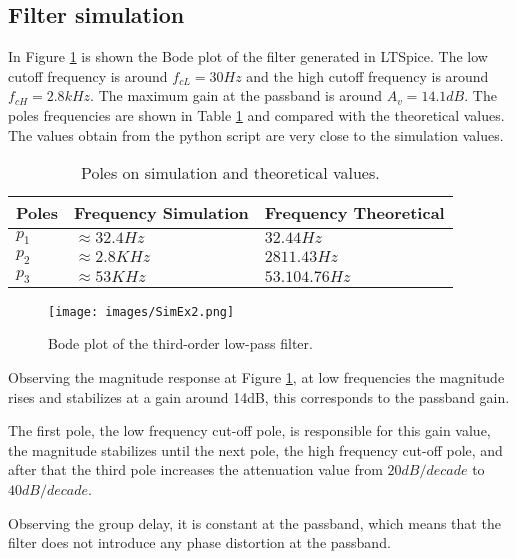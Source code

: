 \subsection{Filter simulation}
In Figure \ref{fig:ex2_bode} is shown the Bode plot of the filter generated in LTSpice. The low cutoff frequency is around $f_{cL} = 30Hz$ and the high cutoff frequency is around $f_{cH} = 2.8kHz$. The maximum gain at the passband is around $A_{v} = 14.1dB$. The poles frequencies are shown in Table \ref{tab:poles} and compared with the theoretical values. The values obtain from the python script are very close to the simulation values.

\begin{table}[h]
    \centering
    \caption{Poles on simulation and theoretical values.}
    \begin{tabularx}{\textwidth}{>{\centering\arraybackslash}X >{\centering\arraybackslash}X >{\centering\arraybackslash}X}
        \toprule
        \textbf{Poles} & \textbf{Frequency Simulation} & \textbf{Frequency Theoretical}\\
        \midrule
        $p_1$ & $\approx 32.4Hz$ & $32.44 Hz$ \\
        \midrule
        $p_2$ &  $\approx 2.8KHz$ & $2811.43 Hz$ \\
        \midrule
        $p_3$ & $\approx 53KHz$ & $53.104.76 Hz$ \\
        \bottomrule
    \end{tabularx}
    \label{tab:poles}
\end{table}

\begin{figure}[H]
    \centering
    \texttt{[image: images/SimEx2.png]}
    \caption{Bode plot of the third-order low-pass filter.}
    \label{fig:ex2_bode}
\end{figure}

Observing the magnitude response at Figure \ref{fig:ex2_bode}, at low frequencies the magnitude rises and stabilizes at a gain around 14dB, this corresponds to the passband gain.

The first pole, the low frequency cut-off pole, is responsible for this gain value, the magnitude stabilizes until the next pole, the high frequency cut-off pole, and after that the third pole increases the attenuation value from $20dB/decade$ to $40dB/decade$.

Observing the group delay, it is constant at the passband, which means that the filter does not introduce any phase distortion at the passband.

